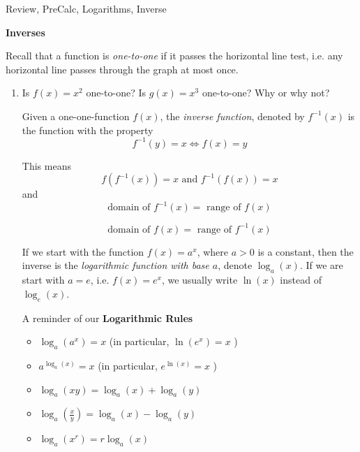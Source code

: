 

\begin{tagblock}{Review, PreCalc, Logarithms, Inverse}
\begin{question}

\textbf{Inverses}


Recall that a function is \emph{one-to-one} if it passes the horizontal line test, i.e. any horizontal line passes through the graph at most once.  

\begin{enumerate}
\item Is $f(x) = x^2$ one-to-one?  Is $g(x) = x^3$ one-to-one? Why or why not?


\vspace{1in} 

Given a one-one-function $f(x)$, the \emph{inverse function}, denoted by $f^{-1}(x)$ is the function with the property 
\[f^{-1}(y) = x \iff f(x) = y\]

This means 
\[f (f^{-1}(x)) = x \text{ and } f^{-1}(f(x)) = x \]
and
\[ \text{domain of } f^{-1}(x) = \text{ range of } f(x) \]

\[ \text{domain of } f(x) = \text{ range of } f^{-1}(x) \]


\bigskip

If we start with the function $f(x) = a^x$, where $a>0$ is a constant, then the inverse is the \emph{logarithmic function with base $a$}, denote $\log_a(x)$.  If we are start with $a=e$, i.e. $f(x) = e^x$, we usually write $\ln(x)$ instead of $\log_e(x)$.  

\bigskip

A reminder of our \textbf{Logarithmic Rules} 
\begin{tcolorbox}


    \begin{itemize}
    \item     $\log_a(a^x)=x$  (in particular, $\ln(e^x) = x$ )
    \item $a^{\log_a(x)} =x$  (in particular, $e^{\ln(x)} = x$ )
    \item  $\log_a(xy) = \log_a(x) +  \log_a(y)$
     \item  $\log_a(\frac{x}{y}) = \log_a(x) -  \log_a(y)$
   \item $\log_a(x^r) = r \log_a(x)$
   \end{itemize}    

\end{tcolorbox}



\end{enumerate}
\end{question}
\end{tagblock}
